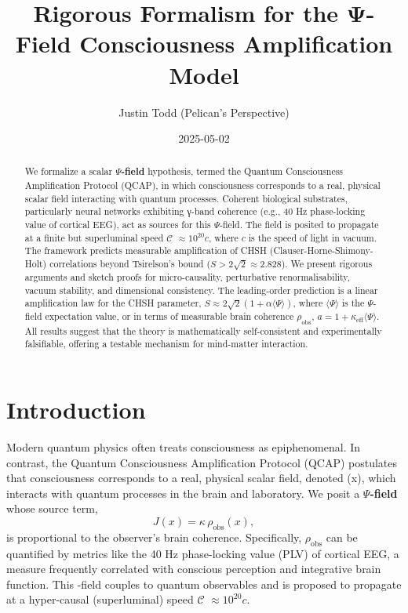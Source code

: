 \documentclass[11pt,a4paper]{article}
\title{\textbf{Rigorous Formalism for the \texorpdfstring{Ψ}{Psi}-Field Consciousness Amplification Model}}
\author{Justin Todd (Pelican’s Perspective)}
\date{2025-05-02}
\newcommand{\PsiField}{\ensuremath{\Psi}}
\newcommand{\PropSpeed}{\ensuremath{\mathscr{C}}}
\newcommand{\expval}[1]{\ensuremath{\langle#1\rangle}}
\begin{document}
\maketitle

\begin{abstract}
We formalize a scalar \textbf{\PsiField-field} hypothesis, termed the Quantum Consciousness Amplification Protocol (QCAP), in which consciousness corresponds to a real, physical scalar field interacting with quantum processes. Coherent biological substrates, particularly neural networks exhibiting γ-band coherence (e.g., 40 Hz phase-locking value of cortical EEG), act as sources for this \PsiField-field. The field is posited to propagate at a finite but superluminal speed \PropSpeed{} $\approx 10^{20} c$, where $c$ is the speed of light in vacuum. The framework predicts measurable amplification of CHSH (Clauser-Horne-Shimony-Holt) correlations beyond Tsirelson’s bound ($S > 2\sqrt{2} \approx 2.828$). We present rigorous arguments and sketch proofs for micro-causality, perturbative renormalisability, vacuum stability, and dimensional consistency. The leading-order prediction is a linear amplification law for the CHSH parameter, $S \approx 2\sqrt{2}(1 + \alpha \expval{\PsiField})$, where $\expval{\PsiField}$ is the \PsiField-field expectation value, or in terms of measurable brain coherence $\rho_{\text{obs}}$, $a = 1 + \kappa_{\text{eff}}\expval{\PsiField}$. All results suggest that the theory is mathematically self-consistent and experimentally falsifiable, offering a testable mechanism for mind-matter interaction.
\end{abstract}

\newpage
\tableofcontents
\newpage

\section{Introduction}
\label{sec:introduction}
Modern quantum physics often treats consciousness as epiphenomenal. In contrast, the Quantum Consciousness Amplification Protocol (QCAP) postulates that consciousness corresponds to a real, physical scalar field, denoted \PsiFieldField(x), which interacts with quantum processes in the brain and laboratory. We posit a \textbf{\PsiField-field} whose source term,
\begin{equation}
    J(x) = \kappa\,\rho_{\text{obs}}(x),
\end{equation}
is proportional to the observer's brain coherence. Specifically, $\rho_{\text{obs}}$ can be quantified by metrics like the 40 Hz phase-locking value (PLV) of cortical EEG, a measure frequently correlated with conscious perception and integrative brain function. This \PsiFieldField-field couples to quantum observables and is proposed to propagate at a hyper-causal (superluminal) speed \PropSpeed{} $\approx 10^{20} c$.
\end{document}
